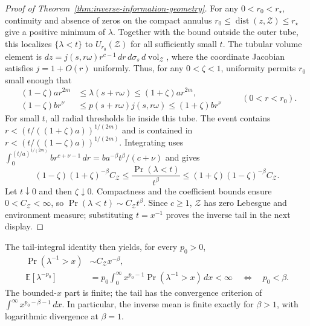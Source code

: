 \begin{proof}[Proof of Theorem~\ref{thm:inverse-information-geometry}]
For any $0<r_0<r_\star$, continuity and absence of zeros on the compact annulus $r_0\le\operatorname{dist}(z,\mathcal Z)\le r_\star$ give a positive minimum of $\lambda$. Together with the bound outside the outer tube, this localizes $\{\lambda<t\}$ to $U_{r_0}(\mathcal Z)$ for all sufficiently small $t$.
The tubular volume element is $dz=j(s,r\omega)r^{c-1}\,dr\,d\sigma_s\,d\operatorname{vol}_{\mathcal Z}$, where the coordinate Jacobian satisfies $j=1+O(r)$ uniformly. Thus, for any $0<\zeta<1$, uniformity permits $r_0$ small enough that
\begin{equation}
\begin{aligned}
(1-\zeta)ar^{2m}&\le\lambda(s+r\omega)\le(1+\zeta)ar^{2m},\\
(1-\zeta)br^\nu&\le p(s+r\omega)j(s,r\omega)\le(1+\zeta)br^\nu
\end{aligned}
\qquad(0<r<r_0).
\label{eq:app-uniform-tube-bounds}
\end{equation}
For small $t$, all radial thresholds lie inside this tube. The event contains $r<(t/((1+\zeta)a))^{1/(2m)}$ and is contained in $r<(t/((1-\zeta)a))^{1/(2m)}$. Integrating uses $\int_0^{(t/a)^{1/(2m)}}br^{c+\nu-1}\,dr=ba^{-\beta}t^\beta/(c+\nu)$ and gives
\begin{equation}
(1-\zeta)(1+\zeta)^{-\beta}C_{\mathcal Z}
\le\frac{\Pr(\lambda<t)}{t^\beta}
\le(1+\zeta)(1-\zeta)^{-\beta}C_{\mathcal Z}.
\label{eq:app-small-information-sandwich}
\end{equation}
Let $t\downarrow0$ and then $\zeta\downarrow0$. Compactness and the coefficient bounds ensure $0<C_{\mathcal Z}<\infty$, so $\Pr(\lambda<t)\sim C_{\mathcal Z}t^\beta$. Since $c\ge1$, $\mathcal Z$ has zero Lebesgue and environment measure; substituting $t=x^{-1}$ proves the inverse tail in the next display.
\end{proof}

The tail-integral identity then yields, for every $p_0>0$,
\begin{equation}
\begin{aligned}
\Pr(\lambda^{-1}>x)&\sim C_{\mathcal Z}x^{-\beta},\\
\mathbb E[\lambda^{-p_0}]&=p_0\int_0^\infty x^{p_0-1}\Pr(\lambda^{-1}>x)\,dx<\infty
\quad\Longleftrightarrow\quad p_0<\beta.
\end{aligned}
\label{eq:app-inverse-moments}
\end{equation}
The bounded-$x$ part is finite; the tail has the convergence criterion of $\int^\infty x^{p_0-\beta-1}\,dx$. In particular, the inverse mean is finite exactly for $\beta>1$, with logarithmic divergence at $\beta=1$.

